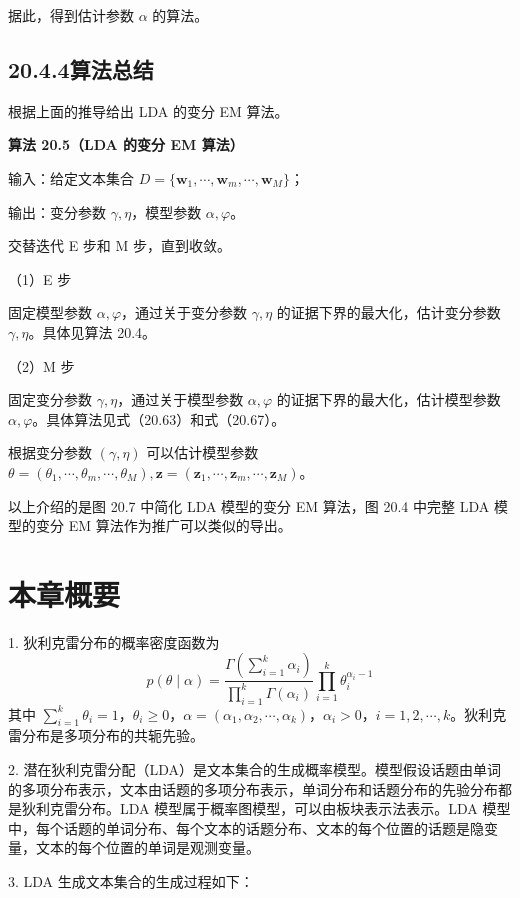\documentclass[UTF8,12pt,a4paper,fontset=fandol]{ctexart}
\begin{document}
据此，得到估计参数 $\alpha$ 的算法。

\subsection*{20.4.4\quad 算法总结}

根据上面的推导给出 LDA 的变分 EM 算法。

\noindent\textbf{算法 20.5（LDA 的变分 EM 算法）}

输入：给定文本集合 $D=\{\mathbf{w}_1,\cdots,\mathbf{w}_m,\cdots,\mathbf{w}_M\}$；

输出：变分参数 $\gamma,\eta$，模型参数 $\alpha,\varphi$。

交替迭代 E 步和 M 步，直到收敛。

（1）E 步

固定模型参数 $\alpha,\varphi$，通过关于变分参数 $\gamma,\eta$ 的证据下界的最大化，估计变分参数 $\gamma,\eta$。具体见算法 20.4。

（2）M 步

固定变分参数 $\gamma,\eta$，通过关于模型参数 $\alpha,\varphi$ 的证据下界的最大化，估计模型参数 $\alpha,\varphi$。具体算法见式（20.63）和式（20.67）。

根据变分参数 $(\gamma,\eta)$ 可以估计模型参数 $\theta=(\theta_1,\cdots,\theta_m,\cdots,\theta_M),\mathbf{z}=(\mathbf{z}_1,\cdots,\mathbf{z}_m,\cdots,\mathbf{z}_M)$。

以上介绍的是图 20.7 中简化 LDA 模型的变分 EM 算法，图 20.4 中完整 LDA 模型的变分 EM 算法作为推广可以类似的导出。

\section*{本章概要}

1. 狄利克雷分布的概率密度函数为
\[
p(\theta\mid\alpha)=\frac{\Gamma\left(\sum_{i=1}^k\alpha_i\right)}{\prod_{i=1}^k\Gamma(\alpha_i)}\prod_{i=1}^k\theta_i^{\alpha_i-1}
\]
其中 $\sum_{i=1}^k\theta_i=1$，$\theta_i\geq 0$，$\alpha=(\alpha_1,\alpha_2,\cdots,\alpha_k)$，$\alpha_i>0$，$i=1,2,\cdots,k$。狄利克雷分布是多项分布的共轭先验。

2. 潜在狄利克雷分配（LDA）是文本集合的生成概率模型。模型假设话题由单词的多项分布表示，文本由话题的多项分布表示，单词分布和话题分布的先验分布都是狄利克雷分布。LDA 模型属于概率图模型，可以由板块表示法表示。LDA 模型中，每个话题的单词分布、每个文本的话题分布、文本的每个位置的话题是隐变量，文本的每个位置的单词是观测变量。

3. LDA 生成文本集合的生成过程如下：
\end{document}
